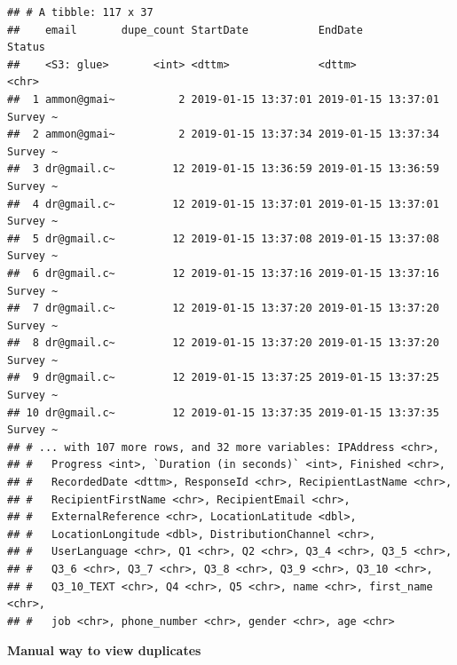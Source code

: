 \documentclass[]{book}
\newenvironment{Shaded}{\begin{snugshade}}{\end{snugshade}}
\newcommand{\KeywordTok}[1]{\textcolor[rgb]{0.13,0.29,0.53}{\textbf{#1}}}
\newcommand{\DecValTok}[1]{\textcolor[rgb]{0.00,0.00,0.81}{#1}}
\newcommand{\StringTok}[1]{\textcolor[rgb]{0.31,0.60,0.02}{#1}}
\newcommand{\CommentTok}[1]{\textcolor[rgb]{0.56,0.35,0.01}{\textit{#1}}}
\newcommand{\OperatorTok}[1]{\textcolor[rgb]{0.81,0.36,0.00}{\textbf{#1}}}
\newcommand{\NormalTok}[1]{#1}
\begin{document}
\begin{verbatim}
## # A tibble: 117 x 37
##    email       dupe_count StartDate           EndDate             Status  
##    <S3: glue>       <int> <dttm>              <dttm>              <chr>   
##  1 ammon@gmai~          2 2019-01-15 13:37:01 2019-01-15 13:37:01 Survey ~
##  2 ammon@gmai~          2 2019-01-15 13:37:34 2019-01-15 13:37:34 Survey ~
##  3 dr@gmail.c~         12 2019-01-15 13:36:59 2019-01-15 13:36:59 Survey ~
##  4 dr@gmail.c~         12 2019-01-15 13:37:01 2019-01-15 13:37:01 Survey ~
##  5 dr@gmail.c~         12 2019-01-15 13:37:08 2019-01-15 13:37:08 Survey ~
##  6 dr@gmail.c~         12 2019-01-15 13:37:16 2019-01-15 13:37:16 Survey ~
##  7 dr@gmail.c~         12 2019-01-15 13:37:20 2019-01-15 13:37:20 Survey ~
##  8 dr@gmail.c~         12 2019-01-15 13:37:20 2019-01-15 13:37:20 Survey ~
##  9 dr@gmail.c~         12 2019-01-15 13:37:25 2019-01-15 13:37:25 Survey ~
## 10 dr@gmail.c~         12 2019-01-15 13:37:35 2019-01-15 13:37:35 Survey ~
## # ... with 107 more rows, and 32 more variables: IPAddress <chr>,
## #   Progress <int>, `Duration (in seconds)` <int>, Finished <chr>,
## #   RecordedDate <dttm>, ResponseId <chr>, RecipientLastName <chr>,
## #   RecipientFirstName <chr>, RecipientEmail <chr>,
## #   ExternalReference <chr>, LocationLatitude <dbl>,
## #   LocationLongitude <dbl>, DistributionChannel <chr>,
## #   UserLanguage <chr>, Q1 <chr>, Q2 <chr>, Q3_4 <chr>, Q3_5 <chr>,
## #   Q3_6 <chr>, Q3_7 <chr>, Q3_8 <chr>, Q3_9 <chr>, Q3_10 <chr>,
## #   Q3_10_TEXT <chr>, Q4 <chr>, Q5 <chr>, name <chr>, first_name <chr>,
## #   job <chr>, phone_number <chr>, gender <chr>, age <chr>
\end{verbatim}

\textbf{Manual way to view duplicates}

\begin{Shaded}
\end{Shaded}
\end{document}
